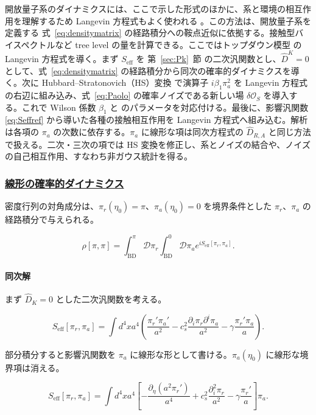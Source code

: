 \documentclass[a4paper,11pt]{ltjsarticle}
\numberwithin{equation}{section}
\newcommand{\subsubsectionlink}[1]{\subsubsection[#1]{\hyperlink{toc}{#1}}}
\def\pia{\pi_{a}}
\def\pir{\pi_{r}}
\newcommand{\Os}{\delta \mathcal{O}_{S}}
\newcommand{\Eq}[1]{Eq.~(\ref{#1})}
\newcommand{\Sec}[1]{Sec.~\ref{#1}}
\renewcommand{\Eq}[1]{式~\eqref{#1}}
\renewcommand{\Sec}[1]{第~\ref{#1}~節}
\begin{document}
開放量子系のダイナミクスには、ここで示した形式のほかに、系と環境の相互作用を理解するため Langevin 方程式もよく使われる \cite{breuerTheoryOpenQuantum2002}。この方法は、開放量子系を定義する \Eq{eq:densitymatrix} の経路積分への鞍点近似に依拠する。接触型バイスペクトルなど tree level の量を計算できる。ここではトップダウン模型 \cite{Creminelli:2023aly} の Langevin 方程式を導く。まず $S_{\mathrm{eff}}$ を \Sec{sec:Pk} の二次汎関数とし、$\widehat D^K=0$ として、\Eq{eq:densitymatrix} の経路積分から同次の確率的ダイナミクスを導く。次に Hubbard--Stratonovich（HS）変換 \cite{Stratonovich1957,Hubbard1959} で演算子 $i\beta_1\pia^2$ を Langevin 方程式の右辺に組み込み、\Eq{eq:Paolo} の確率ノイズである新しい場 $\Os$ を導入する。これで Wilson 係数 $\beta_1$ と \cite{Creminelli:2023aly} のパラメータを対応付ける。最後に、影響汎関数 \eqref{eq:Seffref} から導いた各種の接触相互作用を Langevin 方程式へ組み込む。解析は各項の $\pia$ の次数に依存する。$\pia$ に線形な項は同次方程式の $\widehat D_{R,A}$ と同じ方法で扱える。二次・三次の項では HS 変換を修正し、系とノイズの結合や、ノイズの自己相互作用、すなわち非ガウス統計を得る。

\subsubsectionlink{線形の確率的ダイナミクス}

密度行列の対角成分は、$\pir(\eta_0)=\pi$、$\pia(\eta_0)=0$ を境界条件とした $\pir$、$\pia$ の経路積分で与えられる。

\begin{equation}
    \rho[\pi,\pi]=\int_{\text{BD}}^{\pi}\mathcal{D}\pir\int_{\text{BD}}^{0}\mathcal{D}\pia e^{iS_{\text{eff}}[\pir,\pia]}.
\end{equation}

\paragraph{同次解} まず $\widehat D_K=0$ とした二次汎関数を考える。

\begin{equation}\label{eq:noiselessfree}
    S_{\text{eff}}[\pir,\pia] =  \int d^{4}x a^{4}\left(\frac{\pir'\pia'}{a^{2}} - c_{s}^{2}  \frac{\partial_i \pir  \partial^i \pia}{a^{2}} -   \gamma  \frac{\pir' \pia }{a}\right).
 \end{equation}

部分積分すると影響汎関数を $\pia$ に線形な形として書ける。$\pia(\eta_0)$ に線形な境界項は消える。

\begin{equation}
    S_{\text{eff}}[\pir,\pia] =  \int d^{4}x a^{4}\left[ - \frac{\partial_{\eta}\left(a^{2}\pir'\right)}{a^{4}} + c_{s}^{2}  \frac{\partial_i^{2} \pir}{a^{2}} -   \gamma  \frac{\pir'}{a}\right] \pia.
\end{equation}
\end{document}
